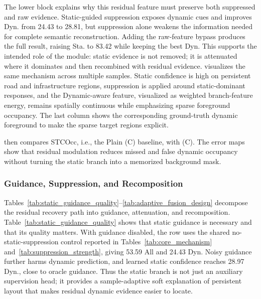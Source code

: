 The lower block explains why this residual feature must preserve both
suppressed and raw evidence. Static-guided suppression exposes dynamic cues and
improves Dyn. from 24.43 to 28.81, but suppression alone weakens the information
needed for complete semantic reconstruction. Adding the raw-feature bypass
produces the full result, raising Sta. to 83.42 while keeping the best Dyn.
This supports the intended role of the module: static evidence is not removed;
it is attenuated where it dominates and then recombined with residual evidence.
 visualizes the same mechanism across
multiple samples. Static confidence is high on persistent road and
infrastructure regions, suppression is applied around static-dominant
responses, and the Dynamic-aware feature, visualized as weighted branch-feature
energy, remains spatially continuous while emphasizing sparse foreground
occupancy. The last column shows the corresponding ground-truth dynamic
foreground to make the sparse target regions explicit.


 then compares STCOcc, i.e., the
Plain (C) baseline, with \nameplus{} (C). The error maps show that residual
modulation reduces missed and false dynamic occupancy without turning the static
branch into a memorized background mask.



\subsubsection{Guidance, Suppression, and Recomposition}
Tables~\ref{tab:static_guidance_quality}--\ref{tab:adaptive_fusion_design}
decompose the residual recovery path into guidance, attenuation, and
recomposition. Table~\ref{tab:static_guidance_quality} shows that static
guidance is necessary and that its quality matters. With
guidance disabled, the row uses the shared no-static-suppression control
reported in Tables~\ref{tab:core_mechanism} and~\ref{tab:suppression_strength},
giving 53.59 All and 24.43 Dyn. Noisy guidance further harms dynamic
prediction, and learned static confidence reaches 28.97 Dyn., close to oracle
guidance. Thus the static
branch is not just an auxiliary supervision head; it provides a sample-adaptive
soft explanation of persistent layout that makes residual dynamic evidence
easier to locate.

